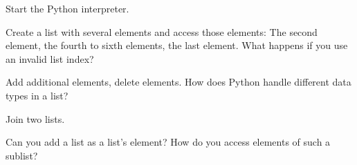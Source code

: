 \begin{aufgabe}[Lists]
Start the Python interpreter.
\begin{auflistung}
\item Create a list with several elements and access those elements: The second element, the fourth to sixth elements, the last element. What happens if you use an invalid list index?
\item Add additional elements, delete elements. How does Python handle different data types in a list?
\item Join two lists.
\item Can you add a list as a list's element? How do you access elements of such a sublist?
\end{auflistung}
\end{aufgabe}

